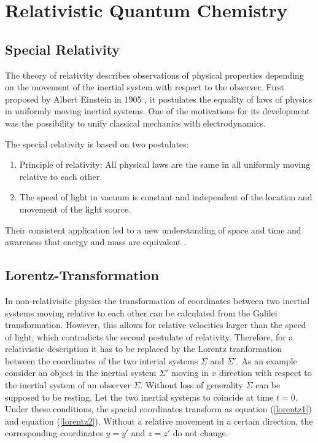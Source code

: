 \chapter{Relativistic Quantum Chemistry}
\section{Special Relativity}

The theory of relativity describes observations of physical properties
depending on the movement
of the inertial system with respect to the observer.
First proposed
by Albert Einstein in 1905 \cite{Einstein05}, it postulates the equality of
laws of physics in uniformly moving inertial systems.
One of the motivations for its development was the possibility to unify
classical mechanics with electrodynamics.

The special relativity is based on two postulates:
\begin{enumerate}
\item Principle of relativity: All physical laws are the same in all uniformly
      moving relative to each other.
\item The speed of light in vacuum is constant and independent of the location
      and movement of the light source.
\end{enumerate}

Their consistent application led to a new understanding of space and time
and awareness that energy and mass are equivalent \cite{nolting4}.


\section{Lorentz-Transformation}
In non-relativisitc physics the transformation of coordinates between two
inertial systems moving relative to each other can be calculated from the
Galilei transformation. However, this allows for relative velocities larger
than the speed of light, which contradicts the second postulate of relativity.
Therefore, for a relativistic description it has to be replaced by the Lorentz
tranformation between the coordinates of the two interial
systems $\Sigma$ and $\Sigma'$.
As an example consider an object in the inertial system $\Sigma'$ moving
in $x$ direction with respect to the inertial system of an observer $\Sigma$.
Without loss of generality $\Sigma$ can be supposed to be resting.
Let the two 
inertial systems to coincide at time $t=0$. Under these conditions, the spacial
coordinates transform as equation (\ref{lorentz1}) and equation (\ref{lorentz2}).
Without a relative movement in a certain direction, the corresponding coordinates
$y=y'$ and $z=z'$ do not change.

